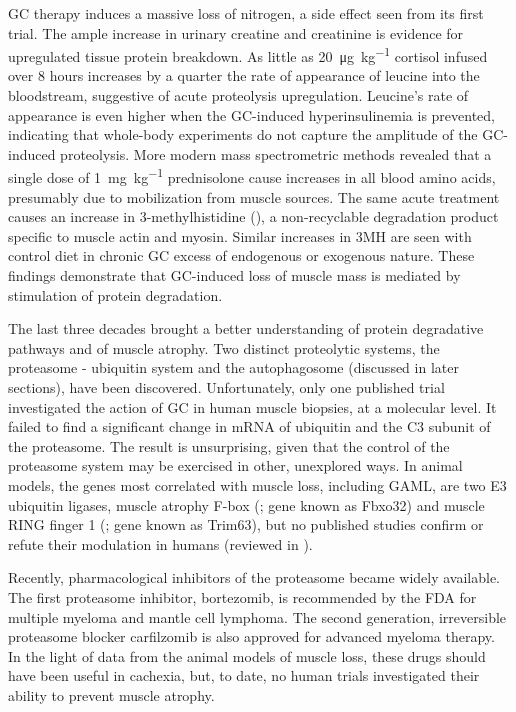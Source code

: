 \documentclass[12pt,english]{report}\usepackage[]{graphicx}\usepackage[]{color}
\begin{document}
GC therapy induces a massive loss of nitrogen, a side effect seen
from its first trial\citep{sprague1950physiological}. The ample increase
in urinary creatine and creatinine is evidence for upregulated tissue
protein breakdown. As little as \SI{20}{\micro\gram\per\kilo\gram}
cortisol infused over 8 hours increases by a quarter the rate of appearance
of leucine into the bloodstream, suggestive of acute proteolysis upregulation\citep{simmons1984increased}.
Leucine's rate of appearance is even higher when the GC-induced hyperinsulinemia
is prevented, indicating that whole-body experiments do not capture
the amplitude of the GC-induced proteolysis\citep{brillon1995effect}.
More modern mass spectrometric methods revealed that a single dose
of \SI{1}{\milli\gram\per\kilo\gram} prednisolone cause increases
in all blood amino acids, presumably due to mobilization from muscle
sources\citep{ellero-simatos2012assessing}. The same acute treatment
causes an increase in 3-methylhistidine (),
a non-recyclable degradation product specific to muscle actin and
myosin\citep{elia1981clinical}. Similar increases in 3MH are seen
with control diet in chronic GC excess of endogenous or exogenous
nature\citep{khaleeli1983corticosteroid}. These findings demonstrate
that GC-induced loss of muscle mass is mediated by stimulation of
protein degradation.

The last three decades brought a better understanding of protein degradative
pathways and of muscle atrophy. Two distinct proteolytic systems,
the proteasome - ubiquitin system and the autophagosome (discussed
in later sections), have been discovered. Unfortunately, only one
published trial investigated the action of GC in human muscle biopsies,
at a molecular level. It failed to find a significant change in mRNA
of ubiquitin and the C3 subunit of the proteasome\citep{lofberg2002effects}.
The result is unsurprising, given that the control of the proteasome
system may be exercised in other, unexplored ways. In animal models,
the genes most correlated with muscle loss, including GAML, are two
E3 ubiquitin ligases, muscle atrophy F-box (;
gene known as Fbxo32) and muscle RING finger 1 (;
gene known as Trim63), but no published studies confirm or refute
their modulation in humans (reviewed in \citep{bodine2014skeletal}).

Recently, pharmacological inhibitors of the proteasome became widely
available. The first proteasome inhibitor, bortezomib, is recommended
by the FDA for multiple myeloma and mantle cell lymphoma\citep{milleniumpharmaceuticalsinc.2014velcade}.
The second generation, irreversible proteasome blocker carfilzomib
is also approved for advanced myeloma therapy\citep{onyxpharmaceuticalsinc.2012kyprolis}.
In the light of data from the animal models of muscle loss, these
drugs should have been useful in cachexia, but, to date, no human
trials investigated their ability to prevent muscle atrophy. 
\end{document}
